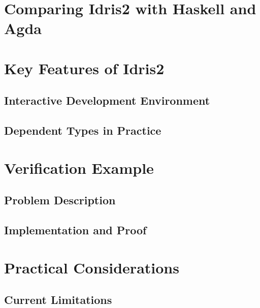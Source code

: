 \documentclass[]{rptuseminar}
\begin{document}
\section{Comparing Idris2 with Haskell and Agda}  

\section{Key Features of Idris2}  
\label{sec:key-features}  
\subsection{Interactive Development Environment}  
\label{subsec:ide}  

\subsection{Dependent Types in Practice}  
\label{subsec:dependent-types}  

\section{Verification Example}  
\label{sec:verification-example}  
\subsection{Problem Description}  
\label{subsec:problem-desc}  

\subsection{Implementation and Proof}  
\label{subsec:implementation}  

\section{Practical Considerations}  
\label{sec:practical-considerations}  
\subsection{Current Limitations}  
\label{subsec:limitations}  
\end{document}
